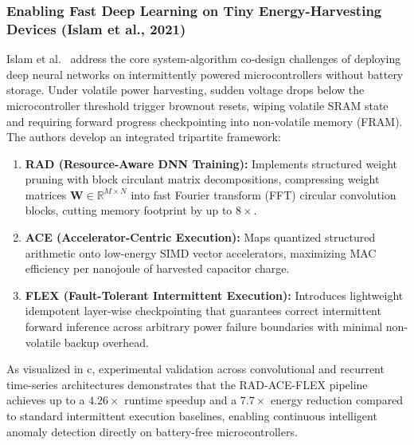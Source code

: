 \subsubsection{Enabling Fast Deep Learning on Tiny Energy-Harvesting Devices (Islam et al., 2021)}
Islam et al.~\cite{Islam2021FastDL} address the core system-algorithm co-design challenges of deploying deep neural networks on intermittently powered microcontrollers without battery storage. Under volatile power harvesting, sudden voltage drops below the microcontroller threshold trigger brownout resets, wiping volatile SRAM state and requiring forward progress checkpointing into non-volatile memory (FRAM). The authors develop an integrated tripartite framework:
\begin{enumerate}
    \item \textbf{RAD (Resource-Aware DNN Training):} Implements structured weight pruning with block circulant matrix decompositions, compressing weight matrices $\mathbf{W} \in \mathbb{R}^{M \times N}$ into fast Fourier transform (FFT) circular convolution blocks, cutting memory footprint by up to $8\times$.
    \item \textbf{ACE (Accelerator-Centric Execution):} Maps quantized structured arithmetic onto low-energy SIMD vector accelerators, maximizing MAC efficiency per nanojoule of harvested capacitor charge.
    \item \textbf{FLEX (Fault-Tolerant Intermittent Execution):} Introduces lightweight idempotent layer-wise checkpointing that guarantees correct intermittent forward inference across arbitrary power failure boundaries with minimal non-volatile backup overhead.
\end{enumerate}
As visualized in c, experimental validation across convolutional and recurrent time-series architectures demonstrates that the RAD-ACE-FLEX pipeline achieves up to a $4.26\times$ runtime speedup and a $7.7\times$ energy reduction compared to standard intermittent execution baselines, enabling continuous intelligent anomaly detection directly on battery-free microcontrollers.


